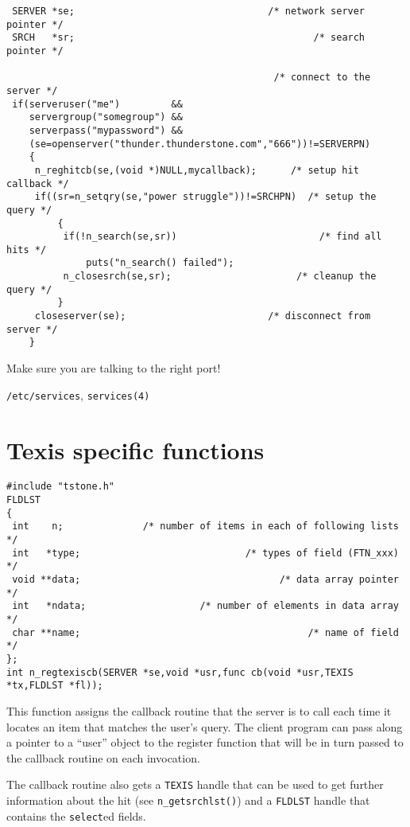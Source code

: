 \EXAMPLE
\begin{verbatim}
 SERVER *se;                                  /* network server pointer */
 SRCH   *sr;                                          /* search pointer */

                                               /* connect to the server */
 if(serveruser("me")         &&
    servergroup("somegroup") &&
    serverpass("mypassword") &&
    (se=openserver("thunder.thunderstone.com","666"))!=SERVERPN)
    {
     n_reghitcb(se,(void *)NULL,mycallback);      /* setup hit callback */
     if((sr=n_setqry(se,"power struggle"))!=SRCHPN)  /* setup the query */
         {
          if(!n_search(se,sr))                         /* find all hits */
              puts("n_search() failed");
          n_closesrch(se,sr);                      /* cleanup the query */
         }
     closeserver(se);                         /* disconnect from server */
    }

\end{verbatim}

\CAVEATS
Make sure you are talking to the right port!

\SEE
\verb`/etc/services`, \verb`services(4)`

\chapter{Texis specific functions}


\SYNOPSIS
\begin{verbatim}
#include "tstone.h"
FLDLST
{
 int    n;              /* number of items in each of following lists */
 int   *type;                             /* types of field (FTN_xxx) */
 void **data;                                   /* data array pointer */
 int   *ndata;                    /* number of elements in data array */
 char **name;                                        /* name of field */
};
int n_regtexiscb(SERVER *se,void *usr,func cb(void *usr,TEXIS *tx,FLDLST *fl));
\end{verbatim}

\DESCRIPTION
This function assigns the callback routine that the server is to call each
time it locates an item that matches the user's query.  The client program
can pass along a pointer to a ``user'' object to the register function
that will be in turn passed to the callback routine on each invocation.

The callback routine also gets a \verb`TEXIS` handle that can be used to
get further information about the hit (see \verb`n_getsrchlst()`) and a
\verb`FLDLST` handle that contains the \verb`select`ed fields.

